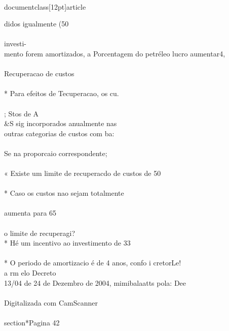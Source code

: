 \\documentclass[12pt]{article}
\begin{document}
didos igualmente (50\\%
\\
investi-\\
mento forem amortizados, a Porcentagem do petréleo lucro aumentar4,\\
\\
Recuperacao de custos\\
\\
* Para efeitos de Tecuperacao, os cu.\\
\\
; Stos de A\\&S sig incorporados anualmente nas\\
outras categorias de custos com ba:\\
\\
Se na proporcaio correspondente;\\
\\
« Existe um limite de recuperacdo de custos de 50\\%
\\
* Caso os custos nao sejam totalmente\\
\\
aumenta para 65\\%
\\
o limite de recuperagi?\\
* Hé um incentivo ao investimento de 33\\%
\\
* O periodo de amortizacio é de 4 anos, confo i cretorLe!\\
a rm elo Decreto\\
13/04 de 24 de Dezembro de 2004, mimibalaatts pola: Dee\\
\\
Digitalizada com CamScanner\\

\\section*{Pagina 42}
\end{document}
